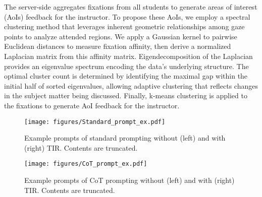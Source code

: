 The server-side aggregates fixations from all students to generate areas of interest (AoIs) feedback for the instructor. To propose these AoIs, we employ a spectral clustering method that leverages inherent geometric relationships among gaze points to analyze attended regions. We apply a Gaussian kernel to pairwise Euclidean distances to measure fixation affinity, then derive a normalized Laplacian matrix from this affinity matrix. Eigendecomposition of the Laplacian provides an eigenvalue spectrum encoding the data's underlying structure. The optimal cluster count is determined by identifying the maximal gap within the initial half of sorted eigenvalues, allowing adaptive clustering that reflects changes in the subject matter being discussed. Finally, k-means clustering is applied to the fixations to generate AoI feedback for the instructor.




\begin{figure*}%
    \centering
    \texttt{[image: figures/Standard\_prompt\_ex.pdf]}
\caption{Example prompts of standard prompting without (left) and with (right) TIR. Contents are truncated.}
    \label{fig:std_prompt_ex}
\end{figure*}

\begin{figure*}%
    \centering
    \texttt{[image: figures/CoT\_prompt\_ex.pdf]}
    \caption{Example prompts of CoT prompting without (left) and with (right) TIR. Contents are truncated.}
    \label{fig:CoT_prompt_ex}
\end{figure*}


